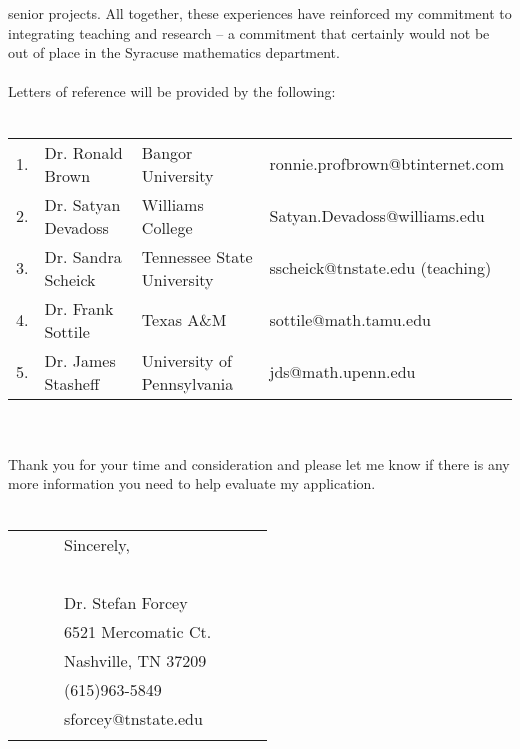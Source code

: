 \documentclass[10pt]{amsart}
\let\url=\undefined
\newcommand{\tubeA}{\raisebox{-.5ex}{\scalebox{.27}{\texttt{[image: signat.pdf]}}}}
\theoremstyle{plain}
\theoremstyle{definition}
\theoremstyle{remark}
\numberwithin{equation}{section}
\begin{document}
senior projects. All together, these experiences have reinforced my commitment to integrating
teaching and research -- a commitment that certainly would not be out of place in the Syracuse
mathematics department.
\\\\
Letters of reference will be provided by the following:
\\\\
 \begin{tabular} {llll}
 1. & Dr. Ronald Brown & Bangor University & ronnie.profbrown@btinternet.com \\
 2. & Dr. Satyan Devadoss & Williams College & Satyan.Devadoss@williams.edu\\
 3. & Dr. Sandra Scheick & Tennessee State University & sscheick@tnstate.edu (teaching) \\
 4.& Dr. Frank Sottile & Texas A\&M & sottile@math.tamu.edu \\
5. & Dr. James Stasheff & University of Pennsylvania & jds@math.upenn.edu\\
\end{tabular}
\\\\
Thank you for your time and consideration and please let me know if there is any more information
you need to help evaluate my application.
\\\\

\begin{tabular}{lllllll}
&&&Sincerely, \\
&&&\ \tubeA \ \ \\
&&&Dr. Stefan Forcey \\
&&&6521 Mercomatic Ct.\\
&&&Nashville, TN 37209 \\
&&&(615)963-5849\\
&&& sforcey@tnstate.edu\\
&&& \url{http://faculty.tnstate.edu/sforcey }\\
\end{tabular}
 
\end{document}
